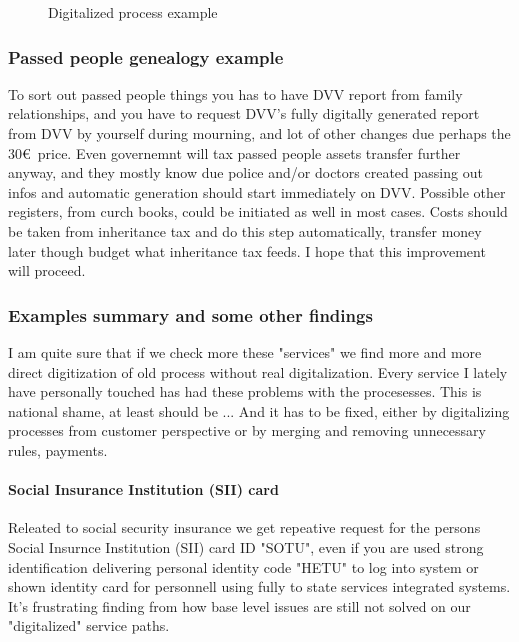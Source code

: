 \begin{figure}
 \begin{center}
  \caption{Digitalized process example}
  \label{fig:digitalized} 
 \end{center}
\end{figure}

\subsubsection{Passed people genealogy example}
To sort out passed people things you has to have DVV report from family
relationships, and you have to request DVV's fully digitally generated report
from DVV by yourself during mourning, and lot of other changes due perhaps the
30\euro~price. Even governemnt will tax passed people assets transfer further
anyway, and they mostly know due police and/or doctors created passing out
infos and automatic generation should start immediately on DVV. Possible other
registers, from curch books, could be initiated as well in most cases. Costs
should be taken from inheritance tax and do this step automatically, transfer
money later though budget what inheritance tax feeds. I hope that this
improvement\allowbreak\cite{SukuselvitysPerukirja} will proceed.

\subsubsection{Examples summary and some other findings}
\label{examples_summary_and_findings}
I am quite sure that if we check more these "services" we find more and more
direct digitization of old process without real digitalization. Every service
I lately have personally touched has had these problems with the procesesses.
This is national shame, at least should be \cite{
 Many_Stepwise_Rules_Leads_To_Mess}\allowbreak\cite{
 StudentHousingAllowance}\allowbreak\cite{ElakelaisetEivatTieda}... And it has
to be fixed, either by digitalizing processes from customer perspective or by
merging and removing unnecessary rules, payments.

\paragraph{Social Insurance Institution (SII) card}
\label{SII_card}
Releated to social security insurance we get repeative request for the persons
Social Insurnce Institution (SII) card ID "SOTU", even if you are used strong
identification delivering personal identity code "HETU" to log into system or
shown identity card for personnell using fully to state services integrated
systems. It's frustrating finding from how base level issues are still not
solved on our "digitalized" service paths.

